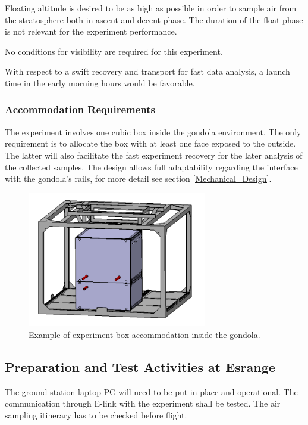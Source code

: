 \documentclass[a4paper,12pt,twoside]{article}
\providecommand{\DIFaddtex}[1]{{\protect\color{blue}\uwave{#1}}} %
\providecommand{\DIFdeltex}[1]{{\protect\color{red}\sout{#1}}}                      %
\providecommand{\DIFaddbegin}{} %
\providecommand{\DIFaddend}{} %
\providecommand{\DIFdelbegin}{} %
\providecommand{\DIFdelend}{} %
\providecommand{\DIFadd}[1]{\texorpdfstring{\DIFaddtex{#1}}{#1}} %
\providecommand{\DIFdel}[1]{\texorpdfstring{\DIFdeltex{#1}}{}} %
\newcommand{\DIFscaledelfig}{0.5}
\newlength{\DIFdelgraphicswidth} %
\newlength{\DIFdelgraphicsheight} %
\newcommand{\DIFaddincludegraphics}[2][]{{\color{blue}\fbox{\DIFOincludegraphics[#1]{#2}}}} %
\newcommand{\DIFdelincludegraphics}[2][]{%
\sbox{\DIFdelgraphicsbox}{\DIFOincludegraphics[#1]{#2}}%
\settoboxwidth{\DIFdelgraphicswidth}{\DIFdelgraphicsbox} %
\settoboxtotalheight{\DIFdelgraphicsheight}{\DIFdelgraphicsbox} %
\scalebox{\DIFscaledelfig}{%
\parbox[b]{\DIFdelgraphicswidth}{\usebox{\DIFdelgraphicsbox}\\[-\baselineskip] \rule{\DIFdelgraphicswidth}{0em}}\llap{\resizebox{\DIFdelgraphicswidth}{\DIFdelgraphicsheight}{%
\setlength{\unitlength}{\DIFdelgraphicswidth}%
\begin{picture}(1,1)%
\thicklines\linethickness{2pt} %
{\color[rgb]{1,0,0}\put(0,0){\framebox(1,1){}}}%
{\color[rgb]{1,0,0}\put(0,0){\line( 1,1){1}}}%
{\color[rgb]{1,0,0}\put(0,1){\line(1,-1){1}}}%
\end{picture}%
}\hspace*{3pt}}} %
} %
\DeclareRobustCommand{\DIFaddbegin}{\DIFOaddbegin \let\includegraphics\DIFaddincludegraphics} %
\DeclareRobustCommand{\DIFaddend}{\DIFOaddend \let\includegraphics\DIFOincludegraphics} %
\DeclareRobustCommand{\DIFdelbegin}{\DIFOdelbegin \let\includegraphics\DIFdelincludegraphics} %
\DeclareRobustCommand{\DIFdelend}{\DIFOaddend \let\includegraphics\DIFOincludegraphics} %
\begin{document}
Floating altitude is desired to be as high as possible in order to sample air from the stratosphere both in ascent and decent phase. The duration of the float phase is not relevant for the experiment performance. 

\smallskip
No conditions for visibility are required for this experiment.

\smallskip
With respect to a swift recovery and transport for fast data analysis, a launch time in the early morning hours would be favorable.

\pagebreak
\subsubsection{Accommodation Requirements}

The experiment involves \DIFdelbegin \DIFdel{one cubic box }\DIFdelend \DIFaddbegin \DIFadd{two cubic boxes }\DIFaddend inside the gondola environment. The only requirement is to allocate the box with at least one face exposed to the outside. The latter will also facilitate the fast experiment recovery for the later analysis of the collected samples. The design allows full adaptability regarding the interface with the gondola's rails, for more detail see section \ref{Mechanical_Design}. 

\begin{figure}[!ht]
    \centering
    \includegraphics[width=0.7\textwidth]{6-launch-campaign-preparation/img/gondola_accommodation.jpg}
    \caption{Example of experiment box accommodation inside the gondola.}
    \label{goldola_accommodation}
\end{figure}
\pagebreak
\subsection{Preparation and Test Activities at Esrange}
The ground station laptop PC will need to be put in place and operational. The communication through E-link with the experiment shall be tested. The air sampling itinerary has to be checked before flight.
\end{document}
